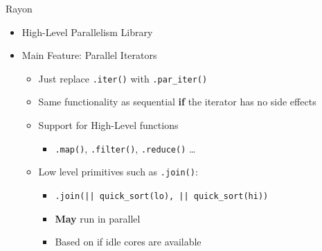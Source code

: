 \documentclass[compress,aspectratio=169]{beamer}
\begin{document}
\begin{frame}{Rayon \cite{rayon}}
  \begin{itemize}
    \item High-Level Parallelism Library
    \item Main Feature: Parallel Iterators
      \begin{itemize}
        \item Just replace \texttt{.iter()} with \texttt{.par\_iter()}
        \item Same functionality as sequential \textbf{if} the iterator has no side effects
        \item Support for High-Level functions
          \begin{itemize}
            \item \texttt{.map()}, \texttt{.filter()}, \texttt{.reduce()} \dots
          \end{itemize}
        \item Low level primitives such as \texttt{.join()}:
          \begin{itemize}
            \item \texttt{.join(|| quick\_sort(lo), || quick\_sort(hi))}
            \item \textbf{May} run in parallel
            \item Based on if idle cores are available
          \end{itemize}
      \end{itemize}
  \end{itemize}
\end{frame}

%
%
\end{document}
